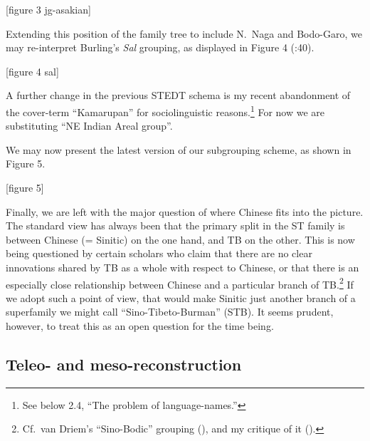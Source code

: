 [figure 3 jg-asakian]

Extending this position of the family tree to include N.\ Naga and Bodo-Garo, we may re-interpret Burling’s {\it Sal} grouping, as displayed in Figure 4 (\citealt{JAM-RGPJ}:40).

[figure 4 sal]

A further change in the previous STEDT schema is my recent abandonment of the cover-term “Kamarupan” for sociolinguistic reasons.\footnote{See below 2.4, “The problem of language-names.”} For now we are substituting “NE Indian Areal group”.

We may now present the latest version of our subgrouping scheme, as shown in Figure 5.

[figure 5]

Finally, we are left with the major question of where Chinese fits into the picture. The standard view has always been that the primary split in the ST family is between Chinese (= Sinitic) on the one hand, and TB on the other. This is now being questioned by certain scholars who claim that there are no clear innovations shared by TB as a whole with respect to Chinese, or that there is an especially close relationship between Chinese and a particular branch of TB.\footnote{Cf.\ van Driem’s “Sino-Bodic” grouping (\citealt{SVD-SB}), and my critique of it (\citealt{JAM-OSB}).} If we adopt such a point of view, that would make Sinitic just another branch of a superfamily we might call “Sino-Tibeto-Burman” (STB). It seems prudent, however, to treat this as an open question for the time being.


\subsection{Teleo- and meso-reconstruction}

